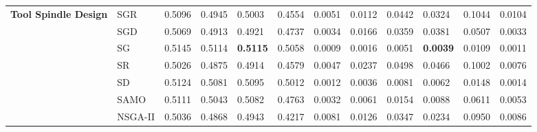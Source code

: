 \begin{table*}[!htb]
\begin{tabular}{|l|l|l|l|l|l|l|l|l|l|l|l|}
		\multirow{7}{*}{\textbf{Tool Spindle Design}}                   & SGR                 & 0.5096     & 0.4945     & 0.5003       & 0.4554      & 0.0051         & 0.0112     & 0.0442     & 0.0324       & 0.1044      & 0.0104            \\
		& SGD                 & 0.5069     & 0.4913     & 0.4921       & 0.4737      & 0.0034        & 0.0166     & 0.0359     & 0.0381       & 0.0507      & 0.0033          \\ 
		& SG                  & 0.5145     & 0.5114     & \textbf{0.5115}       & 0.5058      & 0.0009        & 0.0016     & 0.0051     & \textbf{0.0039}       & 0.0109      & 0.0011           \\ 
		& SR                  & 0.5026     & 0.4875     & 0.4914       & 0.4579      & 0.0047          & 0.0237     & 0.0498     & 0.0466       & 0.1002      & 0.0076         \\ 
		& SD                  & 0.5124     & 0.5081     & 0.5095       & 0.5012      & 0.0012        & 0.0036     & 0.0081     & 0.0062       & 0.0148      & 0.0014           \\ 
		& SAMO                & 0.5111     & 0.5043     & 0.5082       & 0.4763      & 0.0032      & 0.0061     & 0.0154     & 0.0088       & 0.0611      & 0.0053         \\ 
		& NSGA-II             & 0.5036     & 0.4868     & 0.4943       & 0.4217      & 0.0081        & 0.0126     & 0.0347     & 0.0234       & 0.0950      & 0.0086            \\ \hline
	\end{tabular}
	\label{tab:hvigdstat1}
\end{table*}


